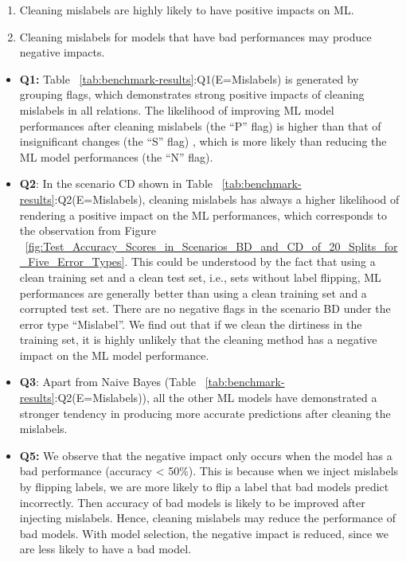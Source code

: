\begin{enumerate}
	\item {
		Cleaning mislabels are highly likely to have positive impacts on ML.
	}
	\item {
		Cleaning mislabels for models that have bad
		performances may produce negative impacts.
	}
\end{enumerate}

\begin{itemize}
	\item{
		\textbf{Q1:} Table ~\ref{tab:benchmark-results}:Q1(E=Mislabels) is generated by grouping flags,
		which demonstrates strong positive impacts of cleaning mislabels in all relations. The likelihood of improving ML model performances after cleaning mislabels (the “P” flag) is higher than that
		of insignificant changes (the “S” flag) , which is more likely than
		reducing the ML model performances (the “N” flag).
	}
	\item {
		\textbf{Q2}: In the scenario CD shown in Table ~\ref{tab:benchmark-results}:Q2(E=Mislabels), cleaning mislabels has always a higher likelihood of rendering a
		positive impact on the ML performances, which corresponds to the observation from Figure ~\ref{fig:Test_Accuracy_Scores_in_Scenarios_BD_and_CD_of_20_Splits_for_Five_Error_Types}. This could be understood by the fact that using a clean training set and a clean test set, i.e., sets without label flipping, ML performances are generally better than using a
		clean training set and a corrupted test set. There are no negative flags in the scenario BD under the error type “Mislabel”. We find
		out that if we clean the dirtiness in the training set, it is highly unlikely that the cleaning method has a negative impact on the ML
		model performance.
	} 
	\item {
		\textbf{Q3}: Apart from Naive Bayes (Table ~\ref{tab:benchmark-results}:Q2(E=Mislabels)), all
		the other ML models have demonstrated a stronger tendency in producing more accurate predictions after cleaning the mislabels.
	}

	\item{
		\textbf{Q5:} We observe that the negative impact only occurs when the
		model has a bad performance (accuracy < 50\%). This is because when we inject mislabels by flipping labels, we are more likely to flip a label that bad models predict incorrectly. Then accuracy of bad models is likely to be improved after injecting mislabels. Hence, cleaning mislabels may reduce the performance of
		bad models. With model selection, the negative impact is reduced,
		since we are less likely to have a bad model.
	}

\end{itemize}

